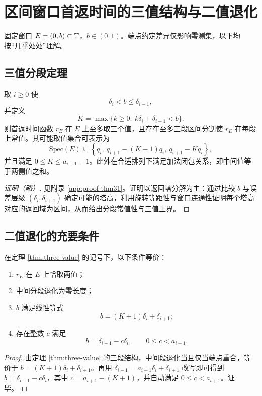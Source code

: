 \section{区间窗口首返时间的三值结构与二值退化}

固定窗口 $E=(0,b)\subset\mathbb{T}$，$b\in(0,1)$。端点约定差异仅影响零测集，以下均按“几乎处处”理解。

\subsection{三值分段定理}

\begin{theorem}[三值返回谱与分段常值性]\label{thm:three-value}
取 $i\ge 0$ 使
\[
\delta_i<b\le \delta_{i-1},
\]
并定义
\[
K=\max\{k\ge 0:\ k\delta_i+\delta_{i+1}<b\}.
\]
则首返时间函数 $r_E$ 在 $E$ 上至多取三个值，且存在至多三段区间分割使 $r_E$ 在每段上常值。其可能取值集合可表示为
\[
\mathrm{Spec}(E)\subseteq \left\{q_i,\ q_{i+1}-(K-1)q_i,\ q_{i+1}-Kq_i\right\},
\]
并且满足 $0\le K\le a_{i+1}-1$。此外在合适排列下满足加法闭包关系，即中间值等于两侧值之和。
\end{theorem}

\begin{proof}[证明（略）]
见附录 \ref{app:proof-thm31}。证明以返回塔分解为主：通过比较 $b$ 与误差层级 $(\delta_i,\delta_{i+1})$ 确定可能的塔高，利用旋转等距性与窗口连通性证明每个塔高对应的返回域为区间，从而给出分段常值性与三值上界。
\end{proof}

\subsection{二值退化的充要条件}

\begin{theorem}[两值退化判别]\label{thm:two-value-criterion}
在定理 \ref{thm:three-value} 的记号下，以下条件等价：
\begin{enumerate}
  \item $r_E$ 在 $E$ 上恰取两值；
  \item 中间分段退化为零长度；
  \item $b$ 满足线性等式
  \[
  b=(K+1)\delta_i+\delta_{i+1};
  \]
  \item 存在整数 $c$ 满足
  \[
  b=\delta_{i-1}-c\delta_i,\qquad 0\le c<a_{i+1}.
  \]
\end{enumerate}
\end{theorem}

\begin{proof}
由定理 \ref{thm:three-value} 的三段结构，中间段退化当且仅当端点重合，等价于 $b=(K+1)\delta_i+\delta_{i+1}$。再用 $\delta_{i-1}=a_{i+1}\delta_i+\delta_{i+1}$ 改写即可得到
$b=\delta_{i-1}-c\delta_i$，其中 $c=a_{i+1}-(K+1)$，并自动满足 $0\le c<a_{i+1}$。证毕。
\end{proof}

